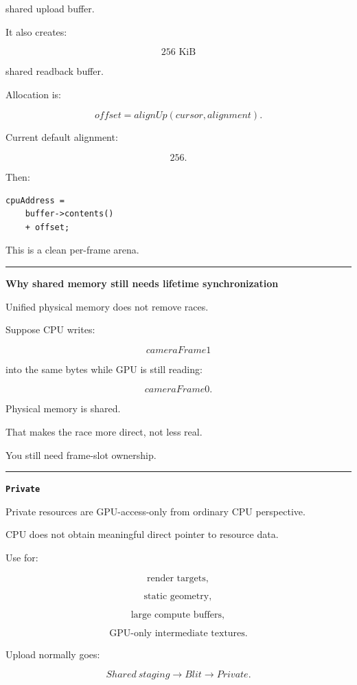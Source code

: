 shared upload buffer.

It also creates:

\[
256\text{ KiB}
\]

shared readback buffer.

Allocation is:

\[
offset=
alignUp(cursor,alignment).
\]

Current default alignment:

\[
256.
\]

Then:

\begin{verbatim}
cpuAddress =
    buffer->contents()
    + offset;
\end{verbatim}

This is a clean per-frame arena.

\begin{center}\rule{0.5\linewidth}{0.5pt}\end{center}

\textbf{Why shared memory still needs lifetime synchronization}

Unified physical memory does not remove races.

Suppose CPU writes:

\[
cameraFrame1
\]

into the same bytes while GPU is still reading:

\[
cameraFrame0.
\]

Physical memory is shared.

That makes the race more direct, not less real.

You still need frame-slot ownership.

\begin{center}\rule{0.5\linewidth}{0.5pt}\end{center}

\textbf{\texttt{Private}}

Private resources are GPU-access-only from ordinary CPU perspective.

CPU does not obtain meaningful direct pointer to resource data.

Use for:

\[
\text{render targets},
\]

\[
\text{static geometry},
\]

\[
\text{large compute buffers},
\]

\[
\text{GPU-only intermediate textures}.
\]

Upload normally goes:

\[
Shared\ staging
\rightarrow
Blit
\rightarrow
Private.
\]

